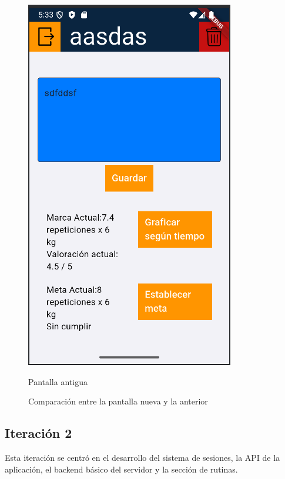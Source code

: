 \begin{figure}[h!]
\begin{minipage}[b]{0.45\textwidth}
    \includegraphics[width=\textwidth]{fotos/ejerciciosVieja.png}
    \caption{Pantalla antigua}
    \label{fig:pantalla_vieja}
  \end{minipage}
  \caption{Comparaci\'on entre la pantalla nueva y la anterior}
  \label{fig:comparacion_pantallas}
\end{figure}

\subsection{Iteraci\'on 2}
Esta iteraci\'on se centr\'o en el desarrollo del sistema de sesiones, la API de la aplicaci\'on, el backend b\'asico del servidor y la secci\'on de rutinas.


